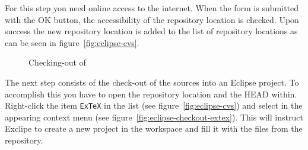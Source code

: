 For this step you need online access to the internet. When the form is
submitted with the OK button, the accessibility of the repository
location is checked. Upon success the new repository location is
added to the list of repository locations as can be seen in
figure~\ref{fig:eclipse-cvs}.
\begin{figure}[htbp]
  \hbox{}\hfill
  \hfill
  \caption{Checking-out of \ExTeX}
\end{figure}

The next step consists of the check-out of the sources into an Eclipse
project. To accomplish this you have to open the repository location
and the HEAD within. Right-click the item \texttt{ExTeX} in the list
(see figure~\ref{fig:eclipse-cvs}) and select  in the
appearing context menu (see figure~\ref{fig:eclipse-checkout-extex}).
This will instruct Exclipe to create a new project in the workspace
and fill it with the files from the repository.

